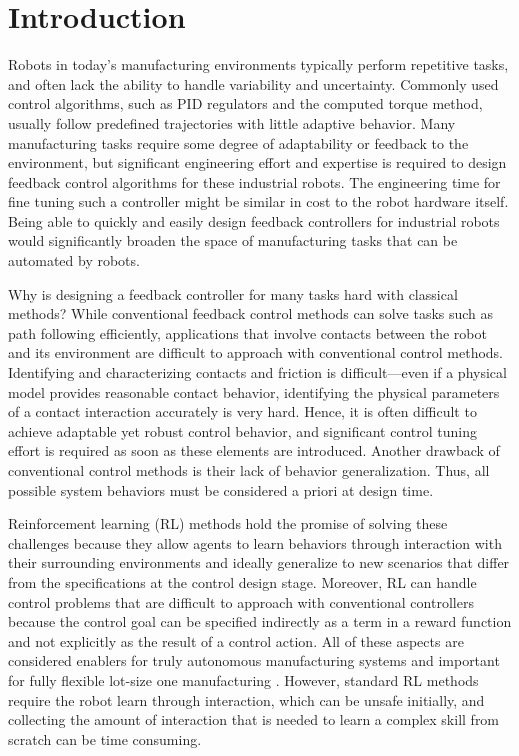 \section{Introduction}\label{sec:introduction}
%
Robots in today's manufacturing environments typically perform repetitive tasks, and often lack the ability to handle variability and uncertainty. 
Commonly used control algorithms, such as PID regulators and the computed torque method, usually follow predefined trajectories with little adaptive behavior.
Many manufacturing tasks require some degree of adaptability or feedback to the environment, but significant engineering effort and expertise is required to design feedback control algorithms for these industrial robots.
The engineering time for fine tuning such a controller might be similar in cost to the robot hardware itself.
Being able to quickly and easily design feedback controllers for industrial robots would significantly broaden the space of manufacturing tasks that can be automated by robots.

Why is designing a feedback controller for many tasks hard with classical methods? While conventional feedback control methods can solve tasks such as path following efficiently, applications that involve contacts between the robot and its environment are difficult to approach with conventional control methods.
Identifying and characterizing contacts and friction is difficult---even if a physical model provides reasonable contact behavior, identifying the physical parameters of a contact interaction accurately is very hard.
Hence, it is often difficult to achieve adaptable yet robust control behavior, and significant control tuning effort is required as soon as these elements are introduced.
Another drawback of conventional control methods is their lack of behavior generalization.
Thus, all possible system behaviors must be considered a priori at design time.

Reinforcement learning (RL) methods hold the promise of solving these challenges because they allow agents to learn behaviors through interaction with their surrounding environments and ideally generalize to new scenarios that differ from the specifications at the control design stage.
Moreover, RL can handle control problems that are difficult to approach with conventional controllers because the control goal can be specified indirectly as a term in a reward function and not explicitly as the result of a control action.  
All of these aspects are considered enablers for truly autonomous manufacturing systems and important for fully flexible lot-size one manufacturing \citep{lotsizeone}.
However, standard RL methods require the robot learn through interaction, which can be unsafe initially, and collecting the amount of interaction that is needed to learn a complex skill from scratch can be time consuming.

